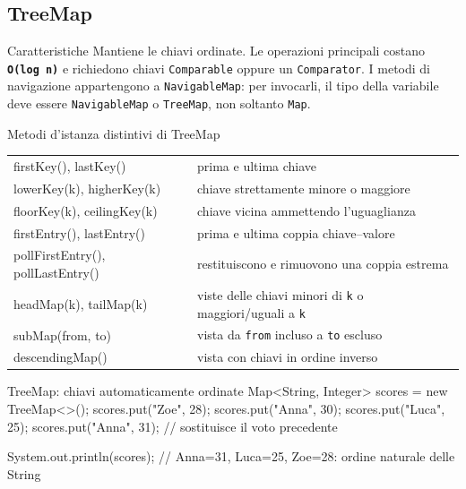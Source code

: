 ﻿\documentclass[10pt,a4paper]{article}
\newcommand{\cmd}[1]{\texttt{#1}}
\newcommand{\complexity}[1]{\textcolor{accent}{\texttt{\textbf{#1}}}}
\newcommand{\topicsubsection}[1]{\Needspace{10\baselineskip}\subsection{#1}}
\newenvironment{topicblock}{%
  \par\medskip\noindent\begin{minipage}{\textwidth}%
}{%
  \end{minipage}\par\medskip%
}
\begin{document}
\begin{topicblock}
\topicsubsection{TreeMap}
\begin{difference}{Caratteristiche}
Mantiene le chiavi ordinate. Le operazioni principali costano
\complexity{O(log n)} e richiedono chiavi \cmd{Comparable} oppure un
\cmd{Comparator}. I metodi di navigazione appartengono a
\cmd{NavigableMap}: per invocarli, il tipo della variabile deve essere
\cmd{NavigableMap} o \cmd{TreeMap}, non soltanto \cmd{Map}.
\end{difference}

\begin{concept}{Metodi d'istanza distintivi di TreeMap}
\begin{tabularx}{\textwidth}{>{\ttfamily\small}p{4cm} X}
firstKey(), lastKey() & prima e ultima chiave \\
lowerKey(k), higherKey(k) & chiave strettamente minore o maggiore \\
floorKey(k), ceilingKey(k) & chiave vicina ammettendo l'uguaglianza \\
firstEntry(), lastEntry() & prima e ultima coppia chiave--valore \\
pollFirstEntry(), pollLastEntry() & restituiscono e rimuovono una coppia estrema \\
headMap(k), tailMap(k) & viste delle chiavi minori di \cmd{k} o maggiori/uguali a \cmd{k} \\
subMap(from, to) & vista da \cmd{from} incluso a \cmd{to} escluso \\
descendingMap() & vista con chiavi in ordine inverso \\
\end{tabularx}
\end{concept}

\begin{codebox}{TreeMap: chiavi automaticamente ordinate}
Map<String, Integer> scores = new TreeMap<>();
scores.put("Zoe", 28);
scores.put("Anna", 30);
scores.put("Luca", 25);
scores.put("Anna", 31); // sostituisce il voto precedente

System.out.println(scores);
// {Anna=31, Luca=25, Zoe=28}: ordine naturale delle String
\end{codebox}

\end{topicblock}
\end{document}
